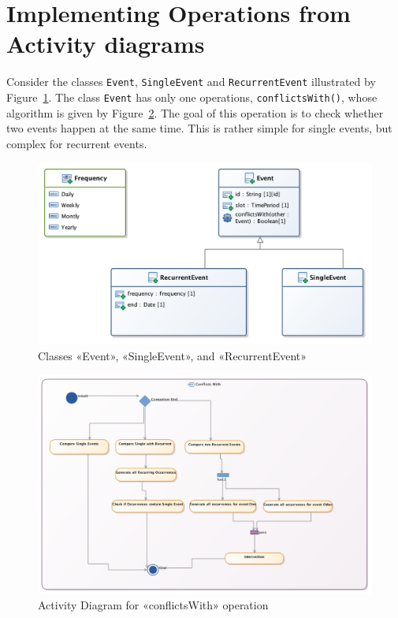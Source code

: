 \documentclass[a4paper,11pt]{memoir}
\newcommand{\code}[1]{\lstinline{#1}}
\begin{document}
\begin{solution}
			
\end{solution}

\newpage
\section{Implementing Operations from Activity diagrams}

Consider the classes \code{Event}, \code{SingleEvent} and \code{RecurrentEvent} illustrated by Figure~\ref{fig:recurrent}.
The class \code{Event} has only one operations, \code{conflictsWith()}, whose algorithm is given by Figure~\ref{fig:conflicts}.
The goal of this operation is to check whether two events happen at the same time. 
This is rather simple for single events, but complex for recurrent events.


\begin{figure}[htbp]
	\centering
		\includegraphics[width=.8\linewidth]{cd-recurrent-event.png}
	\caption{Classes «Event», «SingleEvent», and «RecurrentEvent»}
	\label{fig:recurrent}
\end{figure}


\begin{figure}[htbp]
	\centering
		\includegraphics[width=\linewidth]{ad-conflicts.png}
	\caption{Activity Diagram for «conflictsWith» operation}
	\label{fig:conflicts}
\end{figure}
\end{document}
